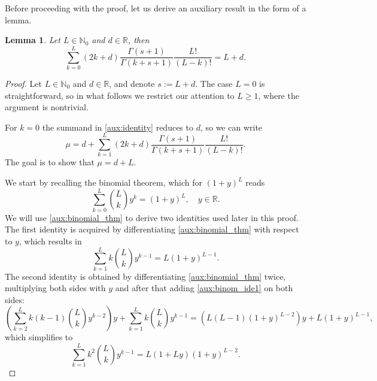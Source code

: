 \documentclass[reqno]{amsart}
\numberwithin{equation}{section}
\numberwithin{figure}{section}
\numberwithin{table}{section}
\theoremstyle{plain}
\newtheorem{lemma}[theorem]{Lemma}
\theoremstyle{definition}
\theoremstyle{remark}
\newcommand{\R}{\mathbb{R}}
\newcommand{\N}{\mathbb{N}}
\begin{document}
Before proceeding with the proof, let us derive an auxiliary result in the form of a lemma.
%
\begin{lemma} \label{proof:lemma_aux}
    Let \( L \in \N_0 \) and \( d \in \R \), then
    \begin{equation} \label{aux:identity}
        \sum^L_{k=0} (2k+d) \frac{\Gamma(s+1)}{\Gamma(k+s+1)} \frac{L!}{(L-k)!} = L + d.
    \end{equation}
\end{lemma}
%
\begin{proof}
    Let \( L \in \N_0 \) and \( d \in \R \), and denote \( s := L + d \).
    The case \( L = 0 \) is straightforward, so in what follows we restrict our attention to \( L \geq 1 \), where the argument is nontrivial.

    
    For \( k=0 \) the summand in \eqref{aux:identity} reduces to \( d \), so we can write
    \begin{equation}
        \mu = d + \sum^L_{k=1} (2k+d) \frac{\Gamma(s+1)}{\Gamma(k+s+1)} \frac{L!}{(L-k)!}.
    \end{equation}
    The goal is to show that \( \mu = d + L \).


    We start by recalling the binomial theorem, which for \( (1+y)^L \) reads
    \begin{equation} \label{aux:binomial_thm}
        \sum^L_{k=0} \binom{L}{k} y^k = (1+y)^L, \quad y \in \R.
    \end{equation}
    We will use \eqref{aux:binomial_thm} to derive two identities used later in this proof.
    The first identity is acquired by differentiating \eqref{aux:binomial_thm} with respect to \( y \), which results in
    \begin{equation} \label{aux:binom_ide1}
        \sum^L_{k=1} k \binom{L}{k} y^{k-1} = L (1+y)^{L-1}.
    \end{equation}
    The second identity is obtained by differentiating \eqref{aux:binomial_thm} twice, multiplying both sides with \( y \) and after that adding \eqref{aux:binom_ide1} on both sides:
    \begin{equation*}
        \left( \sum^L_{k=2} k(k-1) \binom{L}{k} y^{k-2} \right) y + \sum^L_{k=1} k \binom{L}{k} y^{k-1} = \left( L (L-1)(1+y)^{L-2} \right) y + L(1+y)^{L-1},
    \end{equation*}
    which simplifies to
    \begin{equation} \label{aux:binom_ide2}
        \sum^L_{k=1} k^2 \binom{L}{k} y^{k-1} = L (1 + Ly) (1 + y)^{L-2}.
    \end{equation}



\end{proof}
\end{document}
